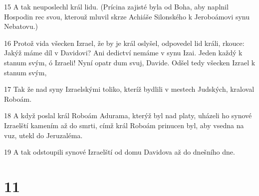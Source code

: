 \par 15 A tak neuposlechl král lidu. (Prícina zajisté byla od Boha, aby naplnil Hospodin rec svou, kterouž mluvil skrze Achiáše Silonského k Jeroboámovi synu Nebatovu.)
\par 16 Protož vida všecken Izrael, že by je král oslyšel, odpovedel lid králi, rkouce: Jakýž máme díl v Davidovi? Ani dedictví nemáme v synu Izai. Jeden každý k stanum svým, ó Izraeli! Nyní opatr dum svuj, Davide. Odšel tedy všecken Izrael k stanum svým,
\par 17 Tak že nad syny Izraelskými toliko, kteríž bydlili v mestech Judských, kraloval Roboám.
\par 18 A když poslal král Roboám Adurama, kterýž byl nad platy, uházeli ho synové Izraelští kamením až do smrti, címž král Roboám prinucen byl, aby vsedna na vuz, utekl do Jeruzaléma.
\par 19 A tak odstoupili synové Izraelští od domu Davidova až do dnešního dne.

\chapter{11}

